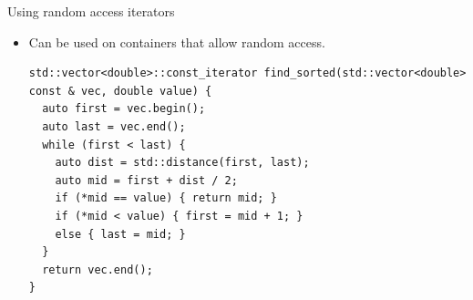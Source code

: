 \begin{frame}[t,fragile]{Using random access iterators}
\begin{itemize}
  \item Can be used on containers that allow random access.
\begin{lstlisting}
std::vector<double>::const_iterator find_sorted(std::vector<double> const & vec, double value) {
  auto first = vec.begin();
  auto last = vec.end();
  while (first < last) {
    auto dist = std::distance(first, last);
    auto mid = first + dist / 2;
    if (*mid == value) { return mid; }
    if (*mid < value) { first = mid + 1; }
    else { last = mid; }
  }
  return vec.end();
}
\end{lstlisting}
\end{itemize}
\end{frame}
